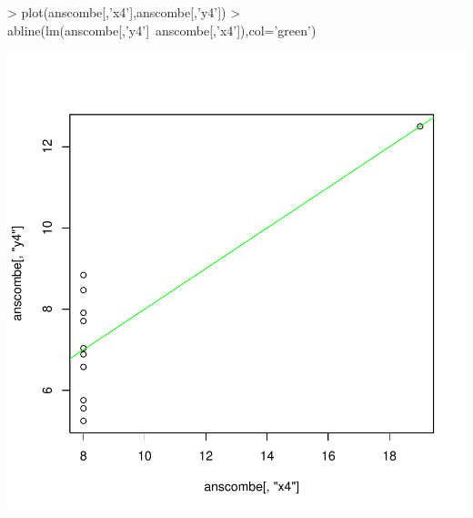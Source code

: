 \begin{Schunk}
\begin{Sinput}
> plot(anscombe[,'x4'],anscombe[,'y4'])
> abline(lm(anscombe[,'y4']~anscombe[,'x4']),col='green')
\end{Sinput}
\end{Schunk}
\includegraphics{sw11_5-004}

